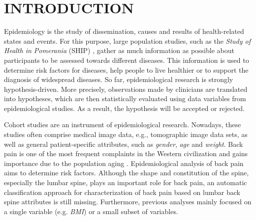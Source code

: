 \documentclass[a4paper,twoside]{style/article}
\begin{document}
\onecolumn \maketitle \normalsize \vfill

\section{\uppercase{Introduction}}
\label{sec:Introduction}
\noindent Epidemiology is the study of dissemination, causes and results of health-related states and events.
For this purpose, large population studies, such as the \emph{Study of Health in Pomerania} (SHIP) \cite{SHIP}, gather as much information as possible about participants to be assessed towards different diseases.
This information is used to determine risk factors for diseases, help people to live healthier or to support the diagnosis of widespread diseases.
So far, epidemiological research is strongly hypothesis-driven.
More precisely, observations made by clinicians are translated into hypotheses, which are then statistically evaluated using data variables from epidemiological studies.
As a result, the hypothesis will be accepted or rejected.

Cohort studies are an instrument of epidemiological research.
Nowadays, these studies often comprise medical image data, e.g., tomographic image data sets, as well as general patient-specific attributes, such as \emph{gender}, \emph{age} and \emph{weight}.
Back pain is one of the most frequent complaints in the Western civilization and gains importance due to the population aging \cite{Hoy2010}.
Epidemiological analysis of back pain aims to determine risk factors.
Although the shape and constitution of the spine, especially the lumbar spine, plays an important role for back pain, an automatic classification approach for characterization of back pain based on lumbar back spine attributes is still missing.
Furthermore, previous analyses mainly focused on a single variable (e.g. \emph{BMI}) or a small subset of variables.
\end{document}
